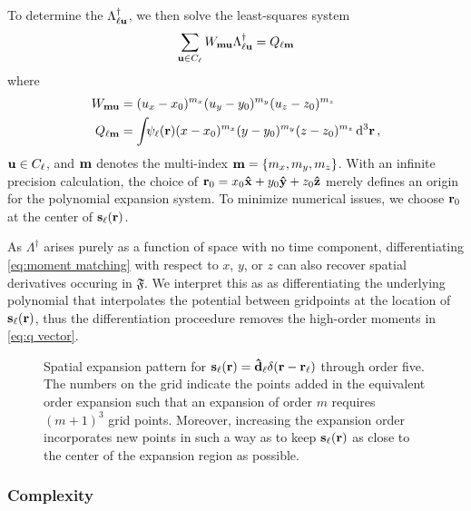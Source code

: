 To determine the $\Lambda_{\ell \vb{u}}^\dagger$, we then solve the least-squares system
\begin{equation}
  \sum_{\vb{u} \in C_\ell} W_{\vb{m}\vb{u}}\Lambda_{\ell\vb{u}}^\dagger = Q_{\ell\vb{m}}
  \label{eq:expansion matrix system}
\end{equation}
where
\begin{subequations}
  \begin{align}
    W_{\vb{m}\vb{u}} &= (u_x - x_0)^{m_x} (u_y - y_0)^{m_y} (u_z - z_0)^{m_z} \label{eq:w matrix} \\
    Q_{\ell \vb{m}} &= \int_{} \psi_\ell(\vb{r}) (x - x_0)^{m_x} (y - y_0)^{m_y} (z - z_0)^{m_z} \dd[3]{\vb{r}} \label{eq:q vector},
  \end{align}
\end{subequations}
$\vb{u} \in C_\ell$, and $\vb{m}$ denotes the multi-index $\vb{m} = \qty{m_x, m_y, m_z}$.
With an infinite precision calculation, the choice of $\vb{r}_0 = x_0 \vu{x} + y_0 \vu{y} + z_0 \vu{z}$ merely defines an origin for the polynomial expansion system.
To minimize numerical issues, we choose $\vb{r}_0$ at the center of $\vb{s}_\ell(\vb{r})$.

As $\Lambda^\dagger$ arises purely as a function of space with no time component, differentiating \cref{eq:moment matching} with respect to $x$, $y$, or $z$ can also recover spatial derivatives occuring in $\mathfrak{F}$.
We interpret this as as differentiating the underlying polynomial that interpolates the potential between gridpoints at the location of $\vb{s}_\ell(\vb{r})$, thus the differentiation proceedure removes the high-order moments in \cref{eq:q vector}.

\begin{figure}
  \centering
  \caption{\label{fig:expansion pattern}Spatial expansion pattern for $\vb{s}_\ell(\vb{r}) = \vu{d}_\ell \delta(\vb{r} - \vb{r}_\ell)$ through order five.
    The numbers on the grid indicate the points added in the equivalent order expansion such that an expansion of order $m$ requires $(m + 1)^3$ grid points.
    Moreover, increasing the expansion order incorporates new points in such a way as to keep $\vb{s}_\ell(\vb{r})$ as close to the center of the expansion region as possible.
  }
\end{figure}

\subsubsection{Complexity}

